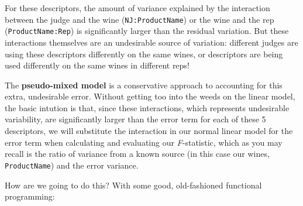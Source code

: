 \documentclass[
]{book}
\begin{document}
For these descriptors, the amount of variance explained by the interaction between the judge and the wine (\texttt{NJ:ProductName}) or the wine and the rep (\texttt{ProductName:Rep}) is significantly larger than the residual variation. But these interactions themselves are an undesirable source of variation: different judges are using these descriptors differently on the same wines, or descriptors are being used differently on the same wines in different reps!

The \textbf{pseudo-mixed model} is a conservative approach to accounting for this extra, undesirable error. Without getting too into the weeds on the linear model, the basic intution is that, since these interactions, which represents undesirable variability, are significantly larger than the error term for each of these 5 descriptors, we will substitute the interaction in our normal linear model for the error term when calculating and evaluating our \emph{F}-statistic, which as you may recall is the ratio of variance from a known source (in this case our wines, \texttt{ProductName}) and the error variance.

How are we going to do this? With some good, old-fashioned functional programming:
\end{document}
